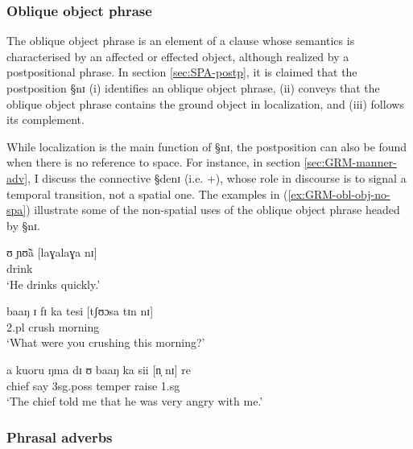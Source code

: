 \subsubsection{Oblique object phrase}
\label{sec:GRM-obl-phrase}

The oblique object phrase is an element of a clause whose  semantics is
characterised by an  affected or effected object, although realized by a
postpositional phrase.  In section \ref{sec:SPA-postp},  it is claimed that the
postposition {\S nɪ} (i) identifies an oblique object phrase, (ii) conveys that
the oblique object phrase contains the ground object in localization, and
(iii) follows its complement. 

While localization is
the main function of  {\S nɪ}, the postposition can also be found when there
is no  reference to space. For instance, in section \ref{sec:GRM-manner-adv}, I
discuss the connective {\S denɪ} (i.e. {\advl}+{\postp}), whose role in
discourse is to signal a temporal transition, not a spatial one.  The
examples in (\ref{ex:GRM-obl-obj-no-spa}) illustrate some of the non-spatial
uses
of the oblique object phrase headed by {\S nɪ}.


\begin{exe}
\ex\label{ex:GRM-obl-obj-no-spa}
\begin{xlist}
\ex
\gll ʊ ɲʊ̃ã  [laɣalaɣa nɪ]  \\
      {\psg} drink {\advm} {\postp}    \\
\glt  `He drinks quickly.' 

\ex
\gll baaŋ ɪ fɪ ka tesi [tʃʊɔsa tɪn nɪ]\\
 {\q} {\sc 2.pl} {\pst} {\egr} crush  morning {\art} {\postp}    \\
\glt  `What were you crushing this morning?' 

\ex\label{ex:GRM-obl-obj-no-spa-foc}
\gll a kuoru ŋma dɪ ʊ baaŋ ka sii [n̩ nɪ] re\\
{\art} chief say {\comp} {\sc 3sg.poss} temper {\egr} raise {\sc 1.sg} {\postp}
{\foc}\\
\glt  `The chief told me that he was very angry with me.' 

\end{xlist}
\end{exe}


\subsubsection{Phrasal adverbs}
\label{sec:GRM-obl-phrase}

